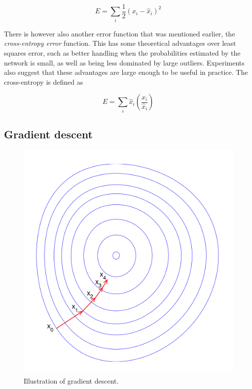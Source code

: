 \documentclass{kththesis}
\begin{document}
\[ E = \sum_i{\frac{1}{2}(x_i - \hat{x}_i)^2} \] 

There is however also another error function that was mentioned earlier, the \textit{cross-entropy error} function. This has some theoretical advantages over least squares error, such as better handling when the probabilities estimated by the network is small, as well as being less dominated by large outliers. Experiments also suggest that these advantages are large enough to be useful in practice. The cross-entropy is defined as~\cite{crossentropy_squared}

\[ E = \sum_i{\hat{x}_i\left(\frac{x_i}{\hat{x}_i}\right)} \]

\newpage
\subsection{Gradient descent}
\begin{figure}
  \includegraphics[width=1.6\linewidth]{img/gradient_descent.png}
  \caption{Illustration of gradient descent.}
  \label{fig:gradient_descent}
\end{figure}
\end{document}

